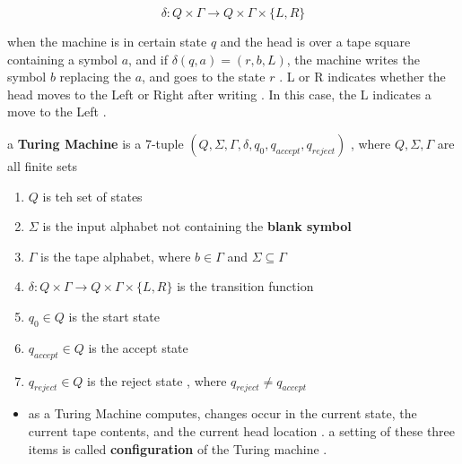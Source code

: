 \documentclass[12pt]{article}
\begin{document}
$$
\delta : Q \times \Gamma \to Q \times \Gamma \times \{ L , R \}
$$


when the machine is in certain state $q$ and the head is over a tape square containing a symbol $a$, and if $\delta(q,a) = (r,b,L)$, the machine writes the symbol $b$ replacing the $a$, and goes to the state $r$ . L or R indicates whether the head moves to the Left or Right after writing . In this case, the L indicates a move to the Left .



\begin{tcolorbox}
a \textbf{Turing Machine} is a 7-tuple $( Q , \Sigma , \Gamma , \delta , q_{0} , q_{accept} , q_{reject} )$ , where $Q , \Sigma , \Gamma $ are all finite sets
\begin{enumerate}
	\item $Q$ is teh set of states
	\item $\Sigma$ is the input alphabet not containing the \textbf{blank symbol}
	\item $\Gamma$ is the tape alphabet, where $b \in \Gamma$ and $\Sigma \subseteq \Gamma$
	\item $\delta : Q \times \Gamma \to Q \times \Gamma \times \{ L , R \}$ is the transition function
	\item $q_{0} \in Q$ is the start state
	\item $q_{accept} \in Q$ is the accept state 
	\item $q_{reject} \in Q$ is the reject state , where $q_{reject} \neq q_{accept} $
\end{enumerate}
\end{tcolorbox}



\begin{tcolorbox}
\begin{itemize}
	\item as a Turing Machine computes, changes occur in the current state, the current tape contents, and the current head location . a setting of these three items is called \textbf{configuration} of the Turing machine .
\end{itemize}
\end{tcolorbox}
\end{document}
